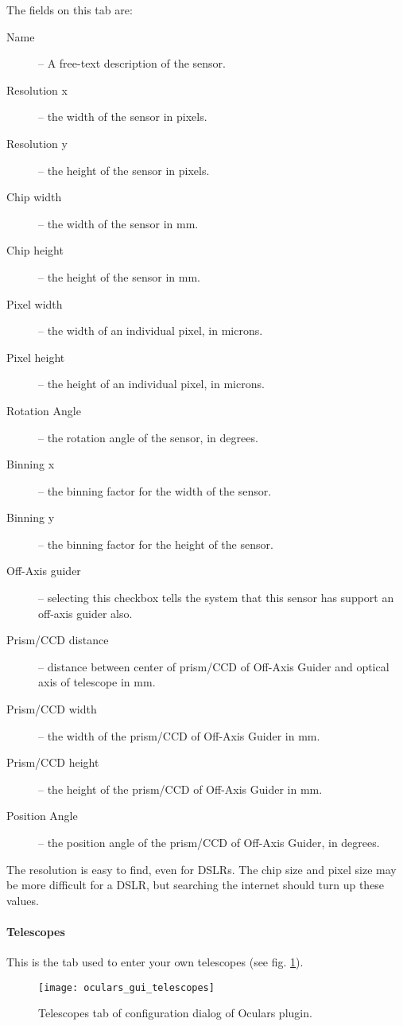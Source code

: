The fields on this tab are:
\begin{description}
\item[Name] -- A free-text description of the sensor.
\item[Resolution x] -- the width of the sensor in pixels.
\item[Resolution y] -- the height of the sensor in pixels.
\item[Chip width] -- the width of the sensor in mm.
\item[Chip height] -- the height of the sensor in mm.
\item[Pixel width] -- the width of an individual pixel, in microns.
\item[Pixel height] -- the height of an individual pixel, in microns.
\item[Rotation Angle] -- the rotation angle of the sensor, in degrees.
\item[Binning x] -- the binning factor for the width of the sensor.
\item[Binning y] -- the binning factor for the height of the sensor.
\item[Off-Axis guider] -- selecting this checkbox tells the system that this sensor has support an off-axis guider also.
\item[Prism/CCD distance] -- distance between center of prism/CCD of Off-Axis Guider and optical axis of telescope in mm.
\item[Prism/CCD width] -- the width of the prism/CCD of Off-Axis Guider in mm.
\item[Prism/CCD height] -- the height of the prism/CCD of Off-Axis Guider in mm.
\item[Position Angle] -- the position angle of the prism/CCD of Off-Axis Guider, in degrees.
\end{description}

The resolution is easy to find, even for DSLRs. The chip size and pixel size may be more difficult for a DSLR, but searching the internet should turn up these values.

\paragraph{Telescopes}

This is the tab used to enter your own telescopes (see fig. \ref{fig:plugins:Oculars:Gui:Telescopes}).

\begin{figure}[ht]\centering
\texttt{[image: oculars\_gui\_telescopes]}
\caption{Telescopes tab of configuration dialog of Oculars plugin.}
\label{fig:plugins:Oculars:Gui:Telescopes}
\end{figure}

